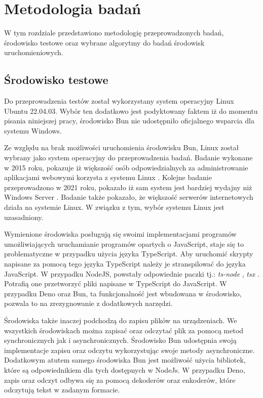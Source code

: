 \section{Metodologia badań}
W tym rozdziale przedstawiono metodologię przeprowadzonych badań, środowisko testowe oraz wybrane algorytmy do badań środowisk uruchomieniowych.

\subsection{Środowisko testowe}
Do przeprowadzenia testów został wykorzystany system operacyjny Linux Ubuntu 22.04.03. Wybór ten dodatkowo jest podyktowany faktem iż do momentu pisania niniejszej pracy, środowisko Bun nie udostępniło oficjalnego wsparcia dla systemu Windows.

Ze względu na brak możliwości uruchomienia środowisku Bun, Linux został wybrany jako system operacyjny do przeprowadzenia badań. Badanie wykonane w 2015 roku, pokazuje iż większość osób odpowiedzialnych za administrowanie aplikacjami webowymi korzysta z systemu Linux \cite{performance_comparison_linux}. Kolejne badanie przeprowadzono w 2021 roku, pokazało iż sam system jest bardziej wydajny niż Windows Server \cite{web_server_performance}. Badanie także pokazało, że większość serwerów internetowych działa na systemie Linux. W związku z tym, wybór systemu Linux jest uzasadniony.

Wymienione środowiska posługują się swoimi implementacjami programów umożliwiających uruchamianie programów opartych o JavaScript, staje się to problematyczne w przypadku użycia języka TypeScript. Aby uruchomić skrypty napisane za pomocą tego języka TypeScript należy je stranspilować do języka JavaScript. W przypadku NodeJS, powstały odpowiednie paczki tj.: \textit{ts-node} \cite{ts_node}, \textit{tsx} \cite{tsx}. Potrafią one przetworzyć pliki napisane w TypeScript do JavaScript. W przypadku Deno oraz Bun, ta funkcjonalność jest wbudowana w środowisko, pozwala to na zrezygnowanie z dodatkowych narzędzi.

Środowiska także inaczej podchodzą do zapisu plików na urządzeniach. We wszystkich środowiskach można zapisać oraz odczytać plik za pomocą metod synchronicznych jak i asynchronicznych. Środowisko Bun udostępnia swoją implementacje zapisu oraz odczytu wykorzystując swoje metody asynchroniczne. Dodatkowym atutem samego środowiska Bun jest możliwość użycia bibliotek, które są odpowiednikiem dla tych dostępnych w NodeJs. W przypadku Deno, zapis oraz odczyt odbywa się za pomocą dekoderów oraz enkoderów, które odczytują tekst w zadanym formacie.

